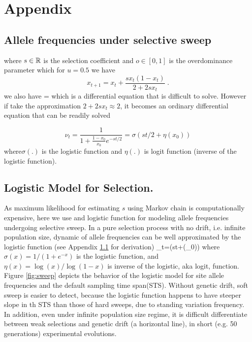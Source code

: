 \documentclass[11pt]{article}
\begin{document}
%
%
%
%
%
%

\clearpage
\setcounter{figure}{0}
\setcounter{table}{0}
\setcounter{equation}{0}
\renewcommand{\thefigure}{S\arabic{figure}}
\renewcommand{\thetable}{S\arabic{table}}
\renewcommand{\theequation}{S\arabic{equation}}

\section{Appendix}
\subsection{Allele frequencies under selective sweep} \label{app:af}

\beq
\eeq
where $s\in {\mathbb R}$ is the selection coefficient and $o\in[0,1]$ is the 
overdominance parameter which for $u=0.5$ we have
\begin{equation}
x_{t+1}=x_t+\frac{sx_t(1-x_t)}{2+2sx_t}\;.
\label{eq:transition}
\end{equation}
we also have
\beq
{} = 
\eeq
which is a differential equation that is difficult to solve. However if take 
the approximation $2+2sx_t \approx 2$, it becomes an ordinary differential 
equation that can be readily solved

\begin{equation}
\nu_t =\frac{1}{1+\frac{1-x_0}{x_0}e^{-st/2}} = \sigma(st/2+\eta(x_0)) 
\label{eq:inf-pop}
\end{equation}
where$\sigma(.)$ is the logistic
function and $\eta(.)$ is logit function (inverse of the logistic function). 

\subsection{Logistic Model for Selection.}
As maximum likelihood for estimating $s$ using Markov chain is computationally 
expensive, here we use and logistic function for modeling allele frequencies 
undergoing selective sweep.
In a pure selection process with no drift, i.e. infinite 
population size, 
dynamic of allele frequencies 
can be well approximated by the logistic function (see 
Appendix \ref{app:af} 
for 
derivation)
\beq
\nu_t=\sigma(st+\eta(\nu_0))\label{eq:nut}
\eeq
where $\sigma(x)=1/(1+e^{-x})$ is the logistic function, and 
$\eta(x)=\log(x)/\log(1-x)$ is inverse of the 
logistic, aka logit, function. Figure \ref{fig:sweep} depicts 
the behavior of 
the logistic model for site allele frequencies and the 
default sampling time 
span(STS). Without genetic drift, soft sweep is easier to 
detect, 
because the logistic function happens to have steeper slope 
in th STS than 
those of hard sweeps, due to standing variation frequency. In addition, even 
under infinite 
population size regime, it is 
difficult differentiate between weak selections and genetic 
drift (a horizontal 
line), in short (e.g. 50 generations) experimental evolutions.
\end{document}
